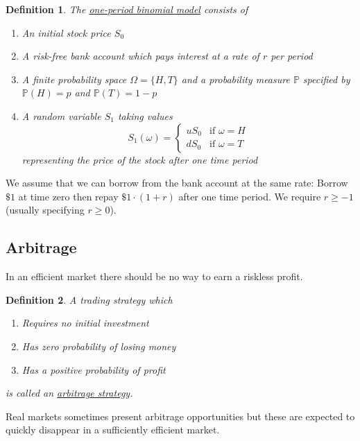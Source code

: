\documentclass[12pt]{article}
\newtheorem{definition}{Definition}
\newlength\tindent
\renewcommand{\indent}{\hspace*{\tindent}}
\renewcommand{\P}{\mathbb P}
\begin{document}
\begin{definition} The \underline{one-period binomial model} consists of
\begin{enumerate}
	\item An initial stock price $S_0$ 
	\item A risk-free bank account which pays interest at a rate of $r$ per period
	\item A finite probability space $\Omega = \{H, T\}$ and a probability measure $\P$ specified by $\P(H) = p$ and $\P(T) = 1 - p$
	\item A random variable $S_1$ taking values
	\begin{equation*}
		S_1(\omega) = 
		\begin{cases}
			uS_0 & \text{if } \omega = H \\
			dS_0 & \text{if } \omega = T
		\end{cases}
	\end{equation*}
	representing the price of the stock after one time period
\end{enumerate}
\end{definition}

\indent We assume that we can borrow from the bank account at the same rate: Borrow $\$1$ at time zero then repay $\$1\cdot(1 + r)$ after one time period. We require $r \geq -1$ (usually specifying $r \geq 0$). \\

\subsection{Arbitrage}

In an efficient market there should be no way to earn a riskless profit.

\begin{definition} A trading strategy which
\begin{enumerate}
	\item Requires no initial investment
	\item Has zero probability of losing money
	\item Has a positive probability of profit
\end{enumerate}

is called an \underline{arbitrage strategy}.
\end{definition}

\indent Real markets sometimes present arbitrage opportunities but these are expected to quickly disappear in a sufficiently efficient market. \\
\end{document}
